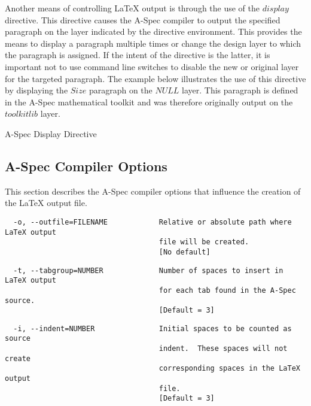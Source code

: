 \documentclass[letterpaper,10pt,draft]{book}
\begin{document}
Another means of controlling \LaTeX{} output is through the use of the $display$
directive.  This directive causes the A-Spec compiler to output the specified paragraph
on the layer indicated by the directive environment.  This provides the means to
display a paragraph multiple times or change the design layer to which the paragraph
is assigned.  If the intent of the directive is the latter, it is important not
to use command line switches to disable the new or original layer for the targeted
paragraph.  The example below illustrates the use of this directive by displaying
the $Size$ paragraph on the $NULL$ layer.  This paragraph is defined in the A-Spec
mathematical toolkit and was therefore originally output on the $toolkitlib$ layer.

\begin{example}
\begin{minipage}[t]{0.49\linewidth}
   
\end{minipage}
\begin{minipage}[t]{0.49\linewidth}
   \azsch
   
\end{minipage}

   \caption{A-Spec Display Directive}
   \label{ex:Display}
\end{example}

\subsection{A-Spec Compiler Options}
   \label{sect:ZOptions}

This section describes the A-Spec compiler options that influence the creation of
the \LaTeX{} output file.

\begin{verbatim}
  -o, --outfile=FILENAME            Relative or absolute path where LaTeX output
                                    file will be created.
                                    [No default]
\end{verbatim}

\begin{verbatim}
  -t, --tabgroup=NUMBER             Number of spaces to insert in LaTeX output
                                    for each tab found in the A-Spec source.
                                    [Default = 3]
\end{verbatim}

\begin{verbatim}
  -i, --indent=NUMBER               Initial spaces to be counted as source
                                    indent.  These spaces will not create
                                    corresponding spaces in the LaTeX output
                                    file.
                                    [Default = 3]
\end{verbatim}
\end{document}
